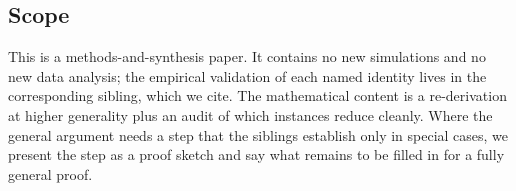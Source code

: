 \subsection{Scope}

This is a methods-and-synthesis paper. It contains no new simulations
and no new data analysis; the empirical validation of each named
identity lives in the corresponding sibling, which we cite. The
mathematical content is a re-derivation at higher generality plus an
audit of which instances reduce cleanly. Where the general argument
needs a step that the siblings establish only in special cases, we
present the step as a proof sketch and say what remains to be filled
in for a fully general proof.
